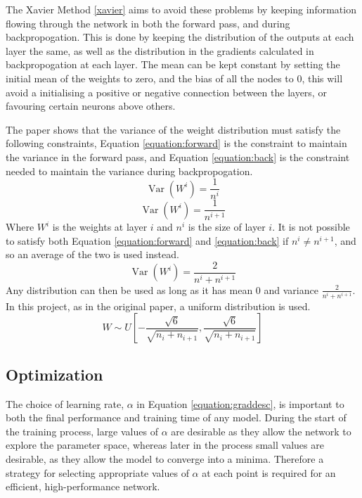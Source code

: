 \documentclass[12pt,a4paper,twoside,openright]{report}
\begin{document}
The Xavier Method \ref{xavier} aims to avoid these problems by keeping information flowing through the network in both the forward pass, and during backpropogation. This is done by keeping the distribution of the outputs at each layer the same, as well as the distribution in the gradients calculated in backpropogation at each layer. The mean can be kept constant by setting the initial mean of the weights to zero, and the bias of all the nodes to 0, this will avoid a initialising a positive or negative connection between the layers, or favouring certain neurons above others. 
\newline
 
The paper shows that the variance of the weight distribution must satisfy the following constraints, Equation \ref{equation:forward} is the constraint to maintain the variance in the forward pass, and Equation \ref{equation:back} is the constraint needed to maintain the variance during backpropogation. 
\begin{equation} \label{equation:forward}
    \operatorname{Var}(W^i) = \frac{1}{n^i}
\end{equation}
\begin{equation} \label{equation:back}
    \operatorname{Var}(W^i) = \frac{1}{n^{i+1}}
\end{equation}
Where $W^i$ is the weights at layer $i$ and $n^i$ is the size of layer $i$. It is not possible to satisfy both Equation \ref{equation:forward} and \ref{equation:back} if $n^i \neq n^{i+1}$, and so an average of the two is used instead.
\begin{equation}
    \operatorname{Var}(W^i) = \frac{2}{n^{i} + n^{i+1}}
\end{equation}
Any distribution can then be used as long as it has mean 0 and variance $\frac{2}{n^{i} + n^{i+1}}$. In this project, as in the original paper, a uniform distribution is used.
\begin{equation}
    W \sim U\left[-\frac{\sqrt{6}}{\sqrt{n_{i}+n_{i+1}}}, \frac{\sqrt{6}}{\sqrt{n_{i}+n_{i+1}}}\right]
\end{equation}

\subsection{Optimization}
The choice of learning rate, $\alpha$ in Equation \ref{equation:graddesc}, is important to both the final performance and training time of any model. During the start of the training process, large values of $\alpha$ are desirable as they allow the network to explore the parameter space, whereas later in the process small values are desirable, as they allow the model to converge into a minima. Therefore a strategy for selecting appropriate values of $\alpha$ at each point is required for an efficient, high-performance network.
\newline
 
\end{document}
